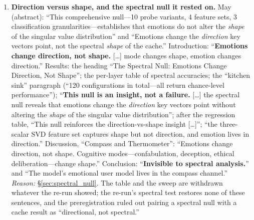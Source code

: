 \documentclass[11pt,a4paper]{article}
\begin{document}
\begin{enumerate}[leftmargin=*]
    \item \label{app:item:shape}\textbf{Direction versus shape, and the spectral null it rested on.} May (abstract): ``This comprehensive null---10 probe variants, 4 feature sets, 3 classification granularities---establishes that emotions do not alter the \emph{shape} of the singular value distribution'' and ``Emotions change the \emph{direction} key vectors point, not the spectral \emph{shape} of the cache.'' Introduction: ``\textbf{Emotions change direction, not shape.} [\ldots] mode changes shape, emotion changes direction.'' Results: the heading ``The Spectral Null: Emotions Change Direction, Not Shape''; the per-layer table of spectral accuracies; the ``kitchen sink'' paragraph (``120 configurations in total---all return chance-level performance''); ``\textbf{This null is an insight, not a failure.} [\ldots] the spectral null reveals that emotions change the \emph{direction} key vectors point without altering the \emph{shape} of the singular value distribution''; after the regression table, ``This null reinforces the direction-vs-shape insight [\ldots]''; ``the three-scalar SVD feature set captures shape but not direction, and emotion lives in direction.'' Discussion, ``Compass and Thermometer'': ``Emotions change direction, not shape. Cognitive modes---confabulation, deception, ethical deliberation---change shape.'' Conclusion: ``\textbf{Invisible to spectral analysis.}'' and ``The model's emotional user model lives in the compass channel.'' \emph{Reason:} \S\ref{sec:spectral_null}. The table and the sweep are withdrawn whatever the re-run showed; the re-run's spectral test restores none of these sentences, and the preregistration ruled out pairing a spectral null with a cache result as ``directional, not spectral.''


\end{enumerate}
\end{document}
